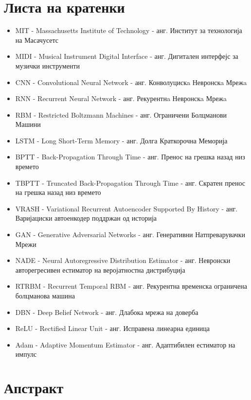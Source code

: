 \chapter*{Листа на кратенки}

\begin{itemize}
    \item MIT - Massachusetts Institute of Technology - анг. Институт за технологија на Масачусетс
    \item MIDI - Musical Instrument Digital Interface - анг. Дигитален интерфејс за музички инструменти
    \item CNN - Convolutional Neural Network - анг. Конволуцискa Невронскa Мрежa
    \item RNN - Recurrent Neural Network - анг. Рекурентнa Невронскa Мрежa
    \item RBM - Restricted Boltzmann Machines - анг. Ограничени Болцманови Машини
    \item LSTM - Long Short-Term Memory - анг. Долга Краткорочна Меморија
    \item BPTT - Back-Propagation Through Time - анг. Пренос на грешка назад низ времето
    \item TBPTT - Truncated Back-Propagation Through Time - анг. Скратен пренос на грешка назад низ времето
    \item VRASH - Variational Recurrent Autoencoder Supported By History - анг. Варијациски автоенкодер поддржан од историја
    \item GAN - Generative Adversarial Networks - анг. Генеративни Натпреварувачки Мрежи
    \item NADE - Neural Autoregressive Distribution Estimator - анг. Невронски авторегресивен естиматор на веројатностна дистрибуција
    \item RTRBM - Recurrent Temporal RBM - анг. Рекурентна временска ограничена болцманова машина
    \item DBN - Deep Belief Network - анг. Длабока мрежа на доверба
    \item ReLU - Rectified Linear Unit - анг. Исправена линеарна единица 
    \item Adam - Adaptive Momentum Estimator - анг. Адаптибилен естиматор на импулс
\end{itemize}

\newpage

\chapter*{Апстракт}

